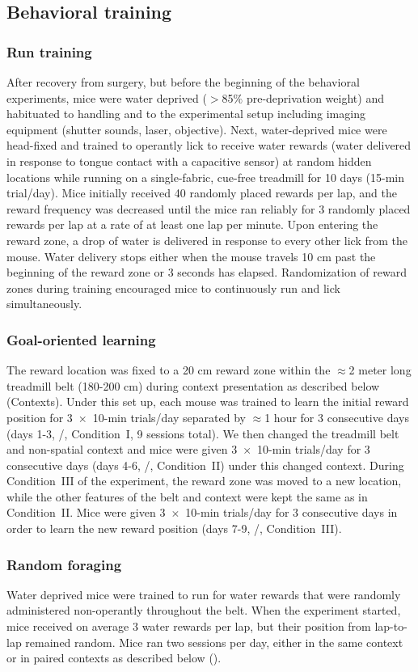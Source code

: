 \subsection{Behavioral training}\label{sec:methods:training}
\subsubsection{Run training}
After recovery from surgery, but before the beginning of the behavioral experiments, mice were water deprived ($>$85$\%$ pre-deprivation weight) and habituated to handling and to the experimental setup including imaging equipment (shutter sounds, laser, objective). Next, water-deprived mice were head-fixed and trained to operantly lick to receive water rewards (water delivered in response to tongue contact with a capacitive sensor) at random hidden locations while running on a single-fabric, cue-free treadmill for 10 days (15-min trial/day). Mice initially received 40 randomly placed rewards per lap, and the reward frequency was decreased until the mice ran reliably for 3 randomly placed rewards per lap at a rate of at least one lap per minute. Upon entering the reward zone, a drop of water is delivered in response to every other lick from the mouse. Water delivery stops either when the mouse travels 10 cm past the beginning of the reward zone or 3 seconds has elapsed. Randomization of reward zones during training encouraged mice to continuously run and lick simultaneously.
\subsubsection{Goal-oriented learning}
The reward location was fixed to a 20 cm reward zone within the $\approx$2 meter long treadmill belt (180-200 cm) during context presentation as described below (Contexts). Under this set up, each mouse was trained to learn the initial reward position for 3~$\times$~10-min trials/day separated by $\approx$1 hour for 3 consecutive days (days 1-3, \A/, Condition~I, 9 sessions total). We then changed the treadmill belt and non-spatial context and mice were given 3~$\times$~10-min trials/day for 3 consecutive days (days 4-6, \Aprime/, Condition~II) under this changed context. During Condition~III of the experiment, the reward zone was moved to a new location, while the other features of the belt and context were kept the same as in Condition~II. Mice were given 3~$\times$~10-min trials/day for 3 consecutive days in order to learn the new reward position (days 7-9, \Aprime/, Condition~III).
\subsubsection{Random foraging}
Water deprived mice were trained to run for water rewards that were randomly administered non-operantly throughout the belt. When the experiment started, mice received on average 3 water rewards per lap, but their position from lap-to-lap remained random. Mice ran two sessions per day, either in the same context or in paired contexts as described below ().

